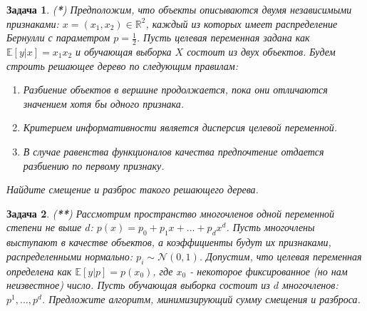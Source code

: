 \documentclass[12pt,fleqn]{article}
\newtheorem{esProblem}{Задача}
\begin{document}
\begin{esProblem}
    (\textbf{*}) Предположим, что объекты описываются двумя независимыми признаками: $x=(x_1, x_2) \in \mathbb{R}^2$, каждый из которых имеет распределение Бернулли с параметром $p=\frac{1}{2}$. Пусть целевая переменная задана как $\mathbb{E}[y|x] = x_1 x_2$ и обучающая выборка $X$ состоит из двух объектов. Будем строить решающее дерево по следующим правилам:
    
    \begin{enumerate}
        \item Разбиение объектов в вершине продолжается, пока они отличаются значением хотя бы одного признака.
        \item Критерием информативности является дисперсия целевой переменной.
        \item В случае равенства функционалов качества предпочтение отдается разбиению по первому признаку.
    \end{enumerate}
    
    \noindent
    Найдите смещение и разброс такого решающего дерева.
\end{esProblem}

\begin{esProblem}
    (\textbf{**}) Рассмотрим пространство многочленов одной переменной степени не выше $d$: $p(x) = p_0 + p_1 x + ... + p_d x^d$. Пусть многочлены выступают в качестве объектов, а коэффициенты будут их признаками, распределенными нормально: $p_i \sim \mathcal{N}(0, 1)$. Допустим, что целевая переменная определена как $\mathbb{E}[y|p] = p(x_0)$, где $x_0$ - некоторое фиксированное (но нам неизвестное) число. Пусть обучающая выборка состоит из $d$ многочленов: $p^1, ..., p^d$. Предложите алгоритм, минимизирующий сумму смещения и разброса.
\end{esProblem}
\end{document}
